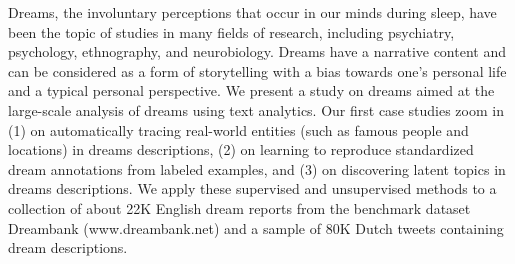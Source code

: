 \documentclass[10pt, a4paper, twopage, headinclude, footinclude, BCOR5mm]{book}
\begin{document}
\begin{table}[t!]
\end{table} 
\begin{table}[t!]
\end{table} 
\noindent
Dreams, the involuntary perceptions that occur in our minds during sleep, have been the topic of studies in many fields of research, including psychiatry, psychology, ethnography, and neurobiology. Dreams have a narrative content and can be considered as a form of storytelling with a bias towards one's personal life and a typical personal perspective. We present a study on dreams aimed at the large-scale analysis of dreams using text analytics. Our first case studies zoom in (1) on automatically tracing real-world entities (such as famous people and locations) in dreams descriptions, (2) on learning to reproduce standardized dream annotations from labeled examples, and (3) on discovering latent topics in dreams descriptions. We apply these supervised and unsupervised methods to a collection of about 22K English dream reports from the benchmark dataset Dreambank (www.dreambank.net) and a sample of 80K Dutch tweets containing dream descriptions.  
\end{document}
